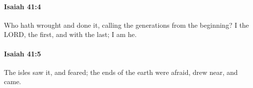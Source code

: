 		\paragraph{Isaiah 41:4} %
			\label{ISAIAH-41-4}

			Who hath wrought and done it, calling the generations from the beginning? I the LORD, the first, and with the last; I am he.


		\paragraph{Isaiah 41:5} %
			\label{ISAIAH-41-5}

			The isles saw it, and feared; the ends of the earth were afraid, drew near, and came.


